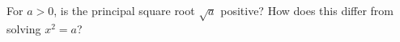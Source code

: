 For $a>0$, is the principal square root $\sqrt a$ positive? How does this differ from solving $x^2=a$?
